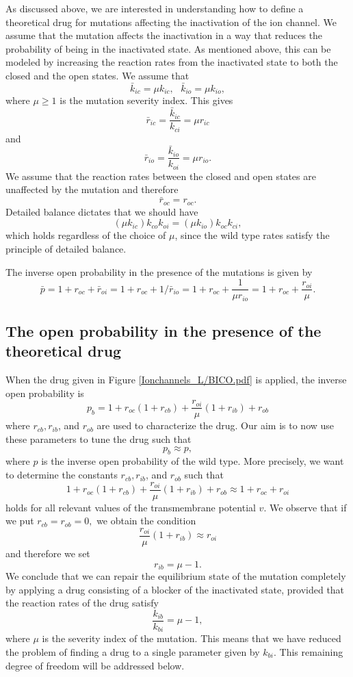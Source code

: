 As discussed above, we are interested in understanding how to define a
theoretical drug for mutations affecting the inactivation of the ion channel.
 We assume that the mutation affects the inactivation in a way that reduces the
probability of being in the inactivated state.  As mentioned above, this can be modeled by increasing
the reaction rates from the inactivated state to both the closed and the open states. We assume that
\[
\bar{k}_{ic}=\mu k_{ic},\text{ }\bar{k}_{io}=\mu k_{io},%
\]
where $\mu\geqslant1$ is the mutation severity index.
This gives%
\[
\bar{r}_{ic}=\frac{\bar{k}_{ic}}{k_{ci}}=\mu r_{ic}%
\]
and%
\[
\bar{r}_{io}=\frac{\bar{k}_{io}}{k_{oi}}=\mu r_{io}.
\]
We assume that the reaction rates between the closed and open states are
unaffected by the mutation and therefore%
\[
\bar{r}_{oc}=r_{oc}.
\]
Detailed balance dictates that we should have
\[
(\mu k_{ic}) k_{co} k_{oi} = (\mu k_{io}) k_{oc} k_{ci},
\] 
which holds regardless of the choice of $\mu$, since the wild type rates satisfy the
principle of detailed balance.

The inverse open probability in the presence of the mutations is given by%
\[
\bar{p}=1+r_{oc}+\bar{r}_{oi}=1+r_{oc}+1/\bar{r}_{io} =1+r_{oc}+\frac{1}{\mu r_{io}}
 = 1+r_{oc}+\frac{r_{oi}}{\mu}.
\]


\subsection{The open probability in the presence of the theoretical drug}

When the drug given in Figure \ref{Ionchannels_L/BICO.pdf} is applied, the inverse open probability is%
\[
p_{b}=1+r_{oc}\left(  1+r_{cb}\right)  +\frac{r_{oi}}{\mu}\left(
1+r_{ib}\right)  +r_{ob}%
\]
where $r_{cb},r_{ib}$, and $r_{ob}$ are used to characterize the drug. Our aim
is to now use these parameters to tune the drug such that%
\[
p_{b}\approx p,
\]
where $p$ is the inverse open probability of the wild type. More precisely, we
want to determine the constants $r_{cb},r_{ib}$, and $r_{ob}$ such that
\[
1+r_{oc}\left(  1+r_{cb}\right)  +\frac{r_{oi}}{\mu}\left(  1+r_{ib}\right)
+r_{ob}\approx1+r_{oc}+r_{oi}%
\]
holds for all relevant values of the transmembrane potential $v.$ We observe
that if we put $r_{cb}=r_{ob}=0,$ we obtain the condition%
\[
\frac{r_{oi}}{\mu}\left(  1+r_{ib}\right)  \approx r_{oi}%
\]
and therefore we set%
\[
r_{ib}=\mu-1.
\]
We conclude that we can repair the equilibrium state of the mutation
completely by applying a drug consisting of a blocker of the inactivated
state, provided that the reaction rates of the drug satisfy%
\[
\frac{k_{ib}}{k_{bi}}=\mu-1,
\]
where $\mu$ is the severity index of the mutation. This means that we have
reduced the problem of finding a drug to a single parameter given by
$k_{bi}.$ This remaining degree of freedom will be addressed below.


